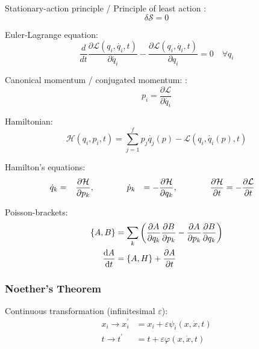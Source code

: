			\noindent
			Stationary-action principle / Principle of least action :
			\begin{equation}
				\delta \mathcal{S}=0
			\end{equation}

			\noindent
			Euler-Lagrange equation:
			\begin{equation}
				 \frac{d}{dt} \frac{\partial \mathcal{L}(q_{i},\dot{q_{i}},t)}{\partial \dot{q_{i}}} - \frac{\partial \mathcal{L}(q_{i},\dot{q_{i}},t)}{\partial q_{i}} = 0 \quad \forall q_i
			\end{equation}

			\noindent
			Canonical momentum / conjugated momentum: :
			\begin{equation}
				p_i=\frac{\partial \mathcal{L}}{\partial\dot{q_i}}
			\end{equation}

			\noindent
			Hamiltonian:
			\begin{equation}
				\mathcal{H}(q_i,p_i,t)=\sum_{j=1}^{f}p_j\dot{q_j}(p) - \mathcal{L}(q_i, \dot{q_i}(p),t)
			\end{equation}

			\noindent
			Hamilton's equations:
			\begin{equation}
				\begin{aligned}
					\dot{q}_k &= \phantom{-}\pdv{\mathcal{H}}{p_k}, &&\hspace{30pt}
					\dot{p}_k &= -\pdv{\mathcal{H}}{q_k}, &&\hspace{30pt}
					\pdv{\mathcal{H}}{t} &= -\pdv{\mathcal{L}}{t}
				\end{aligned}
			\end{equation}

			\noindent
			Poisson-brackets:
			\begin{equation}
				\begin{aligned}
					\qty{A,B} &= \sum_k \left(
						\pdv{A}{q_k}\pdv{B}{p_k} - \pdv{A}{p_k}\pdv{B}{q_k}
					\right) \\
					\dv{A}{t} &= \qty{A, H} + \pdv{A}{t}
				\end{aligned}
			\end{equation}

		\subsubsection{Noether's Theorem}
			\noindent
			Continuous transformation (infinitesimal $\varepsilon$): 
			\begin{equation}
				\begin{aligned}
				x_i \rightarrow x_{i}^{\prime} &= x_i+\varepsilon\psi_i\left(x,\dot{x},t\right) \\
					t\rightarrow t^{\prime}\, &= t+\varepsilon\varphi\left(x,\dot{x},t\right) \\
				\end{aligned}
			\end{equation}

